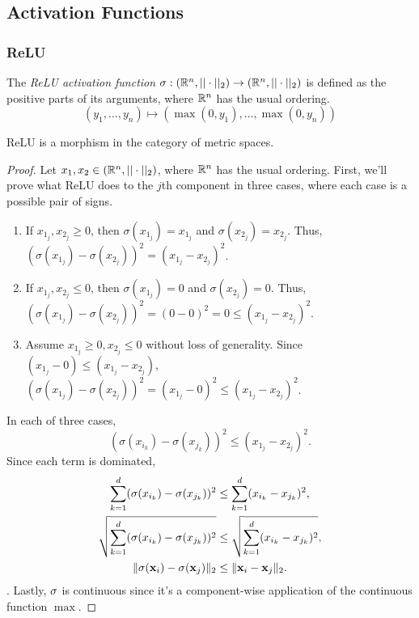 \subsection{Activation Functions}\label{sec:act}
\subsubsection{ReLU}
\begin{definition}
The \emph{ReLU activation function} $\sigma:(\mathbb{R}^n,||\cdot||_2)\to(\mathbb{R}^n,||\cdot||_2)$ is defined as the positive parts of its arguments, where $\mathbb{R}^n$ has the usual ordering.
\[
(y_1,\dots,y_n)\mapsto (\max(0, y_1), \dots, \max(0,y_n))
\]
\end{definition}

\begin{lemma}\label{lem:relu}
ReLU is a morphism in the category of metric spaces.
\end{lemma}

\begin{proof}
Let $x_1,x_2\in (\mathbb{R}^n,||\cdot||_2)$, where $\mathbb{R}^n$ has the usual ordering.
First, we'll prove what ReLU does to the $j$th component in three cases, where each case is a possible pair of signs.

\begin{enumerate}
    \item If $x_{1_j},x_{2_j}\ge0$, then $\sigma(x_{1_j})=x_{1_j}$ and $\sigma(x_{2_j}) = x_{2_j}$. Thus, $(\sigma(x_{1_j})-\sigma(x_{2_j}))^2 = (x_{1_j}-x_{2_j})^2$.
    \item If $x_{1_j},x_{2_j}\le0$, then $\sigma(x_{1_j})=0$ and $\sigma(x_{2_j})=0$. Thus, $(\sigma(x_{1_j})-\sigma(x_{2_j}))^2=(0-0)^2=0\le (x_{1_j}-x_{2_j})^2$.
    \item Assume $x_{1_j}\ge 0, x_{2_j}\le0$ without loss of generality. 
     Since $(x_{1_j}-0)\le (x_{1_j}-x_{2_j})$, $(\sigma(x_{1_j})-\sigma(x_{2_j}))^2=(x_{1_j}-0)^2 \le (x_{1_j}-x_{2_j})^2$.
\end{enumerate}
In each of three cases,
\[
(\sigma(x_{i_k})-\sigma(x_{j_k}))^2 \le (x_{1_j}-x_{2_j})^2.
\]
Since each term is dominated,
\begin{align*}
    \sum_{k=1}^d (\sigma(x_{i_k})-\sigma(x_{j_k}))^2 &\le \sum_{k=1}^d (x_{i_k}-x_{j_k})^2,\\
     \sqrt{\sum_{k=1}^d (\sigma(x_{i_k})-\sigma(x_{j_k}))^2} &\le \sqrt{\sum_{k=1}^d (x_{i_k}-x_{j_k})^2},\\
     \lVert {\sigma(\mathbf{x}_i)-\sigma(\mathbf{x}_j)} \rVert_2 &\le \lVert {\mathbf{x}_i-\mathbf{x}_j} \rVert_2.
\end{align*}.
Lastly, $\sigma$ is continuous since it's a component-wise application of the continuous function $\max$.
\end{proof}

